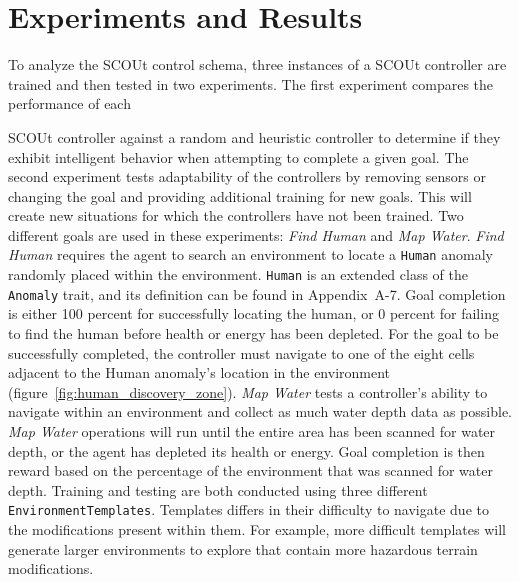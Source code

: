 

\chapter{Experiments and Results} \label{ch:experiments_and_results}
To analyze the SCOUt control schema, three instances of a SCOUt controller are trained and then tested in two experiments.
The first experiment compares the performance of each

\noindent
SCOUt controller against a random and heuristic controller to determine if they exhibit intelligent behavior when attempting to complete a given goal.
The second experiment tests adaptability of the controllers by removing sensors or changing the goal and providing additional training for new goals.
This will create new situations for which the controllers have not been trained.
Two different goals are used in these experiments: \textit{Find Human} and \textit{Map Water}.
\textit{Find Human} requires the agent to search an environment to locate a \texttt{Human} anomaly randomly placed within the environment.
\texttt{Human} is an extended class of the \texttt{Anomaly} trait, and its definition can be found in Appendix~A-7.
Goal completion is either 100 percent for successfully locating the human, or 0 percent for failing to find the human before health or energy has been depleted.
For the goal to be successfully completed, the controller must navigate to one of the eight cells adjacent to the Human anomaly's location in the environment (figure~\ref{fig:human_discovery_zone}).
\textit{Map Water} tests a controller's ability to navigate within an environment and collect as much water depth data as possible.
\textit{Map Water} operations will run until the entire area has been scanned for water depth, or the agent has depleted its health or energy.
Goal completion is then reward based on the percentage of the environment that was scanned for water depth.
Training and testing are both conducted using three different \texttt{EnvironmentTemplates}.
Templates differs in their difficulty to navigate due to the modifications present within them.
For example, more difficult templates will generate larger environments to explore that contain more hazardous terrain modifications.

